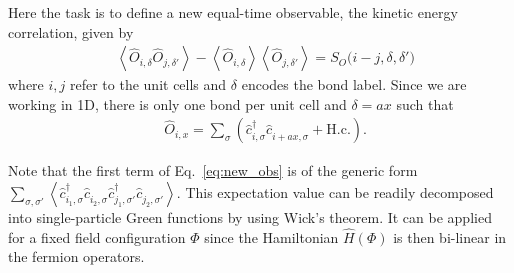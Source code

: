 \documentclass[10pt,modern]{scrartcl}
\numberwithin{exerciseitem}{exercise} %
\begin{document}

Here the task is to define a new equal-time observable, the kinetic energy correlation, given by
\begin{align}
&\left\langle \hat{O}_{i,\delta} \hat{O}_{j,\delta'} \right\rangle  -  \left\langle \hat{O}_{i,\delta} \right\rangle \left\langle \hat{O}_{j,\delta'} \right\rangle  =  S_O\big(i-j,\delta,\delta'\big) \label{eq:new_obs}
\end{align}
where $i,j$ refer to the unit cells and $\delta$ encodes the bond label. Since we are working in 1D, there is only one bond per unit cell and $\delta=ax$ such that
\begin{align}
&\hat{O}_{i,x} = \sum_{\sigma}\left( \hat{c}^\dagger_{i,\sigma}\hat{c}^{\phantom\dagger}_{i+ax,\sigma} +\mathrm{H.c.} \right).
\end{align}


Note that the first term of Eq.~\ref{eq:new_obs} is of the generic form $\sum_{\sigma,\sigma'}\left\langle \hat{c}^\dagger_{i_1,\sigma}\hat{c}^{\phantom\dagger}_{i_2,\sigma} \hat{c}^\dagger_{j_1,\sigma'}\hat{c}^{\phantom\dagger}_{j_2,\sigma'} \right\rangle$. This expectation value can be readily decomposed into single-particle Green functions by using Wick's theorem. It can be applied for a fixed field configuration $\Phi$ since the Hamiltonian $\hat{H}(\Phi)$ is then bi-linear in the fermion operators.
\end{document}

